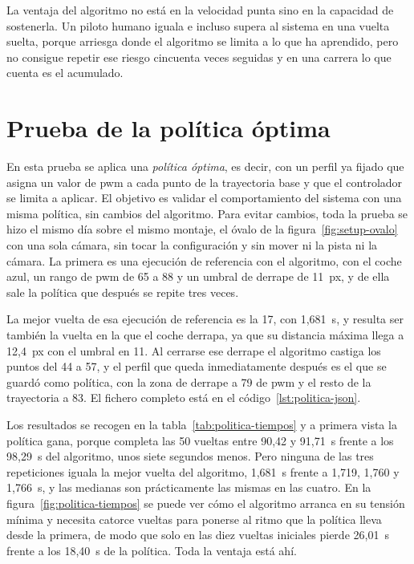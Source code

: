 La ventaja del algoritmo no está en la velocidad punta sino en la capacidad de sostenerla. Un piloto humano iguala e incluso supera al sistema en una vuelta suelta, porque arriesga donde el algoritmo se limita a lo que ha aprendido, pero no consigue repetir ese riesgo cincuenta veces seguidas y en una carrera lo que cuenta es el acumulado. 



\section{Prueba de la política óptima}
\label{sec:prueba-politica-optima}

En esta prueba se aplica una \emph{política óptima}, es decir, con un perfil ya fijado que asigna un valor de \gls{pwm} a cada punto de la trayectoria base y que el controlador se limita a aplicar. %
El objetivo es validar el comportamiento del sistema con una misma política, sin cambios del algoritmo. 
Para evitar cambios, toda la prueba %
se hizo el mismo día sobre el mismo montaje, el óvalo de la figura~\ref{fig:setup-ovalo} con una sola cámara, sin tocar la configuración y sin mover ni la pista ni la cámara. La primera es una ejecución de referencia con el algoritmo, con el coche azul, un rango de \gls{pwm} de 65 a 88 y un umbral de derrape de 11~px, y de ella sale la política que después se repite tres veces.

La mejor vuelta de esa ejecución de referencia es la 17, con 1,681~s, y resulta ser también la vuelta en la que el coche derrapa, ya que su distancia máxima llega a 12,4~px con el umbral en 11. Al cerrarse ese derrape el algoritmo castiga los puntos del 44 a 57, y el perfil que queda inmediatamente después es el que se guardó como política, con la zona de derrape a 79 de \gls{pwm} y el resto de la trayectoria a 83. El fichero completo está en el código~\ref{lst:politica-json}.

Los resultados se recogen en la tabla~\ref{tab:politica-tiempos} y a primera vista la política gana, porque completa las 50 vueltas entre 90,42 y 91,71~s frente a los 98,29~s del algoritmo, unos siete segundos menos. Pero ninguna de las tres repeticiones iguala la mejor vuelta del algoritmo, 1,681~s frente a 1,719, 1,760 y 1,766~s, y las medianas son prácticamente las mismas en las cuatro. En la figura~\ref{fig:politica-tiempos} se puede ver cómo el algoritmo arranca en su tensión mínima y necesita catorce vueltas para ponerse al ritmo que la política lleva desde la primera, de modo que solo en las diez vueltas iniciales pierde 26,01~s frente a los 18,40~s de la política. Toda la ventaja está ahí.

